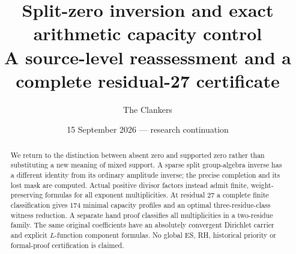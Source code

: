 \documentclass[11pt,a4paper]{article}
\title{Split-zero inversion and exact arithmetic capacity control\\
\large A source-level reassessment and a complete residual-27 certificate}
\author{The Clankers}
\date{15 September 2026 --- research continuation}
\begin{document}
\maketitle
\begin{abstract}
We return to the distinction between absent zero and supported zero rather
than substituting a new meaning of mixed support. A sparse split group-algebra
inverse has a different identity from its ordinary amplitude inverse; the
precise completion and its lost mask are computed. Actual positive divisor
factors instead admit finite, weight-preserving formulas for all exponent
multiplicities. At residual 27 a complete finite classification gives 174
minimal capacity profiles and an optimal three-residue-class witness reduction.
A separate hand proof classifies all multiplicities in a two-residue family.
The same original coefficients have an absolutely convergent Dirichlet carrier
and explicit $L$-function component formulas. No global ES, RH, historical
priority or formal-proof certification is claimed.
\end{abstract}


\end{document}
